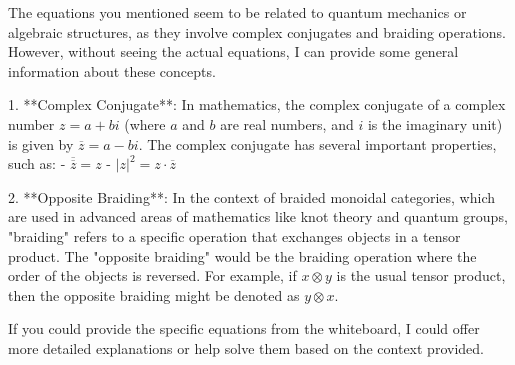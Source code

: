 The equations you mentioned seem to be related to quantum mechanics or algebraic structures, as they involve complex conjugates and braiding operations. However, without seeing the actual equations, I can provide some general information about these concepts.

1. **Complex Conjugate**: In mathematics, the complex conjugate of a complex number \( z = a + bi \) (where \( a \) and \( b \) are real numbers, and \( i \) is the imaginary unit) is given by \( \overline{z} = a - bi \). The complex conjugate has several important properties, such as:
   - \( \overline{\overline{z}} = z \)
   - \( |z|^2 = z \cdot \overline{z} \)

2. **Opposite Braiding**: In the context of braided monoidal categories, which are used in advanced areas of mathematics like knot theory and quantum groups, "braiding" refers to a specific operation that exchanges objects in a tensor product. The "opposite braiding" would be the braiding operation where the order of the objects is reversed. For example, if \( x \otimes y \) is the usual tensor product, then the opposite braiding might be denoted as \( y \otimes x \).

If you could provide the specific equations from the whiteboard, I could offer more detailed explanations or help solve them based on the context provided.